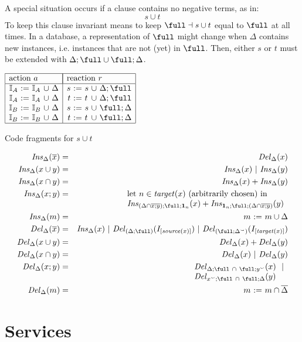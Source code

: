 \documentclass[11pt,a4paper,fleqn,oneside]{article}
\newcommand{\one}[1]{{\cal\bf 1}_{#1}}
\newcommand{\choice}[2]{#1\ |\ #2}
\newcommand{\all}[2]{#1 + #2}
\newcommand{\assign}[2]{#1~{\tt :=}~#2}
\def\id#1{\text{\em #1\/}}
\newcommand{\ident}[1]{\mathbb{I}_{#1}}
\newcommand{\flip}[1]{{#1}^\smallsmile}
\newcommand{\cmpl}[1]{\overline{#1}}
\newcommand{\compose}{;}
\newcommand{\subs}{\dashv}
\begin{document}
	A special situation occurs if a clause contains no negative terms,
	as in:
\[s\cup t\]
	To keep this clause invariant means to keep $\full\subs s\cup t$ equal to $\full$ at all times.
	In a database, a representation of $\full$ might change when
	$\Delta$ contains new instances, i.e. instances that are not (yet) in $\full$.
	Then, either $s$ or $t$ must be extended with $\Delta\compose \full\cup \full\compose\Delta$.
	
\begin{table}[ht]
\begin{center}
\(\begin{array}{|r@{~\tt :=~}l@{~}c@{~}c|r@{~\tt :=~}l@{~}c@{~}c|}
\hline
\multicolumn{4}{|l|}{\text{action $a$}}&\multicolumn{4}{|l|}{\text{reaction $r$}}\\\hline
\ident{A}&\ident{A}&\cup&\Delta&s&s&\cup&\Delta\compose \full\\
\ident{A}&\ident{A}&\cup&\Delta&t&t&\cup&\Delta\compose \full\\
\ident{B}&\ident{B}&\cup&\Delta&s&s&\cup&\full\compose\Delta\\
\ident{B}&\ident{B}&\cup&\Delta&t&t&\cup&\full\compose\Delta\\
\hline
\end{array}\)
\end{center}
\caption{Code fragments for $s\cup t$}
\end{table}

\begin{eqnarray}
\id{Ins}_\Delta(\cmpl{x})&=&\id{Del}_\Delta(x)\\
\id{Ins}_\Delta(x\cup y)&=&\choice{\id{Ins}_\Delta(x)}{\id{Ins}_\Delta(y)}\\
\id{Ins}_\Delta(x\cap y)&=&\all{\id{Ins}_\Delta(x)}{\id{Ins}_\Delta(y)}\\
\id{Ins}_\Delta(x\compose y)&=&\begin{array}[t]{@{}l}\text{let $n\in\id{target}(x)$ (arbitrarily chosen) in}\\ \all{\id{Ins}_{(\Delta\cap\cmpl{x\compose y})\compose\full\compose\one{n}}(x)}{\id{Ins}_{\one{n}\compose\full\compose(\Delta\cap\cmpl{x\compose y})}(y)}\end{array}\\
\id{Ins}_\Delta(m)&=&\assign{m}{m\cup\Delta}\\
\id{Del}_\Delta(\cmpl{x})&=&\choice{\choice{\id{Ins}_\Delta(x)}{\id{Del}_{(\Delta\compose\full)}(I_{[\id{source}(x)]})}}{\id{Del}_{(\full\compose\flip{\Delta})}(I_{[\id{target}(x)]})}\\
\id{Del}_\Delta(x\cup y)&=&\all{\id{Del}_\Delta(x)}{\id{Del}_\Delta(y)}\\
\id{Del}_\Delta(x\cap y)&=&\choice{\id{Del}_\Delta(x)}{\id{Del}_\Delta(y)}\\
\id{Del}_\Delta(x\compose y)&=&\begin{array}[t]{@{}l}\id{Del}_{\Delta\compose\full\ \cap\ \full\compose\flip{y}}(x)\ \ |\\
\id{Del}_{\flip{x}\compose\full\ \cap\ \full\compose\Delta}(y) \end{array}\\
\id{Del}_\Delta(m)&=&\assign{m}{m\cap\cmpl{\Delta}}
\end{eqnarray}


\section{Services}
	
\end{document}
